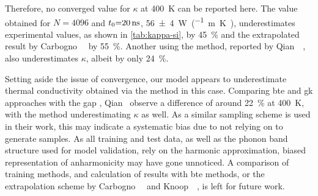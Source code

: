 Therefore, no converged value for $\kappa$ at \qty{400}{K} can be reported here. The value obtained for $N{=}4096$ and $t_0{=}\qty{20}{ns}$, \qty{56\pm4}{W\per(m.K)}, underestimates experimental values, as shown in \cref{tab:kappa-si}, by \qty{45}{\percent} and the extrapolated \aigk result by Carbogno~\etal~\cite{crs2017t} by \qty{55}{\percent}. Another \mlp using the \gk method, reported by Qian~\etal~\cite{qpwy2019q}, also underestimates $\kappa$, albeit by only \qty{24}{\percent}.


\vspace{\baselineskip}

\noindent
Setting aside the issue of convergence, our model appears to underestimate thermal conductivity obtained via the \gk method in this case. Comparing \gls{bte} and \gls{gk} approaches with the \gls{gap} \mlp, Qian~\etal{} observe a difference of around \qty{22}{\percent} at \qty{400}{K}, with the \gk method underestimating $\kappa$ as well. As a similar sampling scheme is used in their work, this may indicate a systematic bias due to not relying on \aimd to generate samples. As all training and test data, as well as the phonon band structure used for model validation, rely on the harmonic approximation, biased representation of anharmonicity may have gone unnoticed. A comparison of training methods, and calculation of results with \gls{bte} methods, or the extrapolation scheme by Carbogno~\etal~\cite{crs2017t} and Knoop~\etal~\cite{kpsc2023t,kpsc2023t}, is left for future work.
